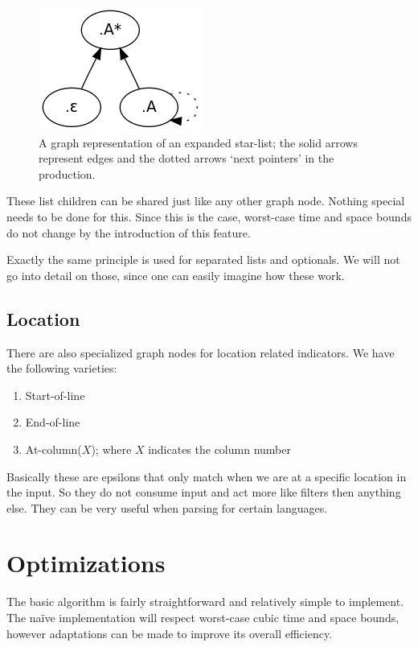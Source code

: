 \documentclass[a4paper,10pt]{article}
\begin{document}
\begin{figure}[H]
\centering
\includegraphics[scale=0.5]{star-list.png}
\caption{A graph representation of an expanded star-list; the solid arrows represent edges and the dotted arrows `next pointers' in the production.}
\end{figure}

These list children can be shared just like any other graph node. Nothing special needs to be done for this. Since this is the case, worst-case time and space bounds do not change by the introduction of this feature.

Exactly the same principle is used for separated lists and optionals. We will not go into detail on those, since one can easily imagine how these work.

\subsection{Location}

There are also specialized graph nodes for location related indicators. We have the following varieties:
\begin{enumerate}
 \setlength{\itemsep}{0pt}
 \setlength{\parskip}{0pt}
 \setlength{\parsep}{0pt}
 
 \item Start-of-line
 \item End-of-line
 \item At-column($X$); where $X$ indicates the column number
\end{enumerate}
Basically these are epsilons that only match when we are at a specific location in the input. So they do not consume input and act more like filters then anything else. They can be very useful when parsing for certain languages.

\section{Optimizations}
\label{chap:optimizations}

The basic algorithm is fairly straightforward and relatively simple to implement. The naïve implementation will respect worst-case cubic time and space bounds, however adaptations can be made to improve its overall efficiency.
\end{document}
